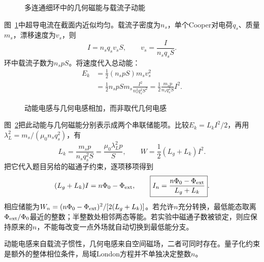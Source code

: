 \begin{figure}[H]\centering
{}
\caption{多连通细环中的几何磁能与载流子动能}\label{fig:i3-h14-q}
\end{figure}
\begin{solution}
图~\ref{fig:i3-h14-q}中超导电流在截面内近似均匀。载流子密度为$n_s$，单个Cooper对电荷$q_s$、质量$m_s$，漂移速度为$v_s$，则
\[
I=n_sq_sv_sS,\qquad v_s=\frac{I}{n_sq_sS}.
\]
环中载流子数为$n_spS$。将速度代入总动能：
\[
\begin{aligned}
E_k&=\frac12(n_spS)m_sv_s^2\\
&=\frac12n_spSm_s\frac{I^2}{n_s^2q_s^2S^2}
=\frac12\frac{m_sp}{n_sq_s^2S}I^2.
\end{aligned}
\]
\begin{figure}[H]\centering
{}
\caption{动能电感与几何电感相加，而非取代几何电感}\label{fig:i3-h14-s}
\end{figure}
图~\ref{fig:i3-h14-s}把此动能与几何磁能分别表示成两个串联储能项。比较$E_k=L_kI^2/2$，再用$\lambda_L^2=m_s/(\mu_0n_sq_s^2)$，有
\[
\boxed{L_k=\frac{m_sp}{n_sq_s^2S}
=\frac{\mu_0\lambda_L^2p}{S}},\qquad
W=\frac12(L_g+L_k)I^2.
\]
把它代入题目另给的磁通子约束，逐项移项得到
\[
(L_g+L_k)I=n\Phi_0-\Phi_{\rm ext},\qquad
\boxed{I_n=\frac{n\Phi_0-\Phi_{\rm ext}}{L_g+L_k}}.
\]
相应储能为$W_n=(n\Phi_0-\Phi_{\rm ext})^2/[2(L_g+L_k)]$。若允许$n$充分转换，最低能态取离$\Phi_{\rm ext}/\Phi_0$最近的整数；半整数处相邻两态等能。若实验中磁通子数被锁定，则应保持原来的$n$，不能每改变一点外场就自动切换到最低能分支。

动能电感来自载流子惯性，几何电感来自空间磁场，二者可同时存在。量子化约束是额外的整体相位条件，局域London方程并不单独决定整数$n$。
\end{solution}
